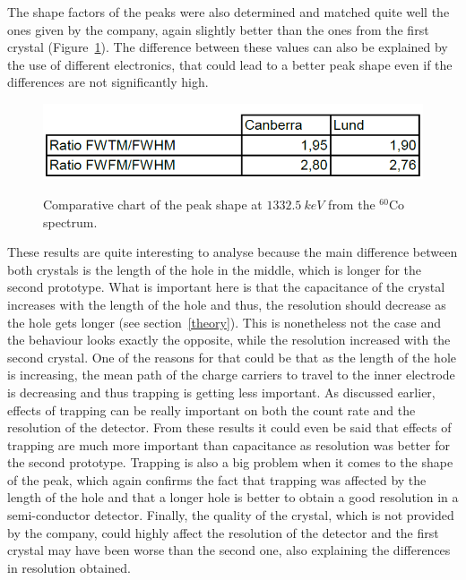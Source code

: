 \documentclass[11pt,a4paper]{article}
\begin{document}
The shape factors of the peaks were also determined and matched quite well the ones given by the company, again slightly better than the ones from the first crystal (Figure~\ref{shape2}). The difference between these values can also be explained by the use of different electronics, that could lead to a better peak shape even if the differences are not significantly high.

\begin{figure}[!h]
\centering
\caption{Comparative chart of the peak shape at $1332.5~keV$ from the $^{60}$Co spectrum.}
\includegraphics[scale=0.7]{shape.png}
\label{shape2}
\end{figure}
These results are quite interesting to analyse because the main difference between both crystals is the length of the hole in the middle, which is longer for the second prototype. What is important here is that the capacitance of the crystal increases with the length of the hole and thus, the resolution should decrease as the hole gets longer (see section~\ref{theory}). This is nonetheless not the case and the behaviour looks exactly the opposite, while the resolution increased with the second crystal. One of the reasons for that could be that as the length of the hole is increasing, the mean path of the charge carriers to travel to the inner electrode is decreasing and thus trapping is getting less important. As discussed earlier, effects of trapping can be really important on both the count rate and the resolution of the detector. From these results it could even be said that effects of trapping are much more important than capacitance as resolution was better for the second prototype. Trapping is also a big problem when it comes to the shape of the peak, which again confirms the fact that trapping was affected by the length of the hole and that a longer hole is better to obtain a good resolution in a semi-conductor detector. Finally, the quality of the crystal, which is not provided by the company, could highly affect the resolution of the detector and the first crystal may have been worse than the second one, also explaining the differences in resolution obtained.
\end{document}

